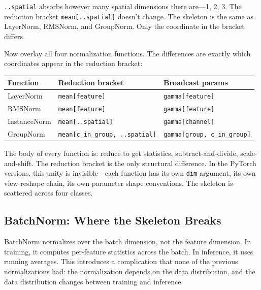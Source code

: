 \documentclass[11pt,titlepage]{article}
\begin{document}
\texttt{..spatial} absorbs however many spatial dimensions there
are---1, 2, 3. The reduction bracket \texttt{mean{[}..spatial{]}}
doesn't change. The skeleton is the same as LayerNorm, RMSNorm, and
GroupNorm. Only the coordinate in the bracket differs.

Now overlay all four normalization functions. The differences are
exactly which coordinates appear in the reduction bracket:

\begin{longtable}[]{@{}lll@{}}
\toprule
Function & Reduction bracket & Broadcast params\tabularnewline
\midrule
\endhead
LayerNorm & \texttt{mean{[}feature{]}} &
\texttt{gamma{[}feature{]}}\tabularnewline
RMSNorm & \texttt{mean{[}feature{]}} &
\texttt{gamma{[}feature{]}}\tabularnewline
InstanceNorm & \texttt{mean{[}..spatial{]}} &
\texttt{gamma{[}channel{]}}\tabularnewline
GroupNorm & \texttt{mean{[}c\_in\_group,\ ..spatial{]}} &
\texttt{gamma{[}group,\ c\_in\_group{]}}\tabularnewline
\bottomrule
\end{longtable}

The body of every function is: reduce to get statistics,
subtract-and-divide, scale-and-shift. The reduction bracket is the only
structural difference. In the PyTorch versions, this unity is
invisible---each function has its own \texttt{dim} argument, its own
view-reshape chain, its own parameter shape conventions. The skeleton is
scattered across four classes.

\vspace{2em}

\hypertarget{batchnorm-where-the-skeleton-breaks}{%
\subsection{BatchNorm: Where the Skeleton
Breaks}\label{batchnorm-where-the-skeleton-breaks}}

BatchNorm normalizes over the batch dimension, not the feature
dimension. In training, it computes per-feature statistics across the
batch. In inference, it uses running averages. This introduces a
complication that none of the previous normalizations had: the
normalization depends on the data distribution, and the data
distribution changes between training and inference.
\end{document}
